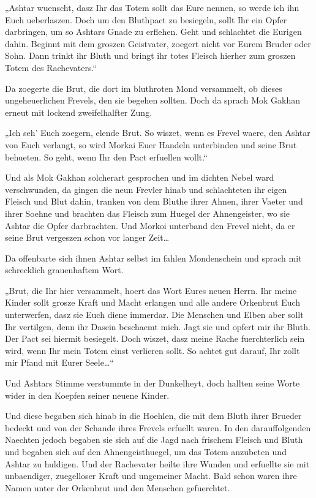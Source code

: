 \documentclass[a5paper,8pt]{book}
\begin{document}
„Ashtar wuenscht, dasz Ihr das Totem sollt das Eure nennen, so werde ich ihn Euch ueberlaszen. Doch um den Bluthpact zu besiegeln, sollt Ihr ein Opfer darbringen, um so Ashtars Gnade zu erflehen. Geht und schlachtet die Eurigen dahin. Beginnt mit dem groszen Geistvater, zoegert nicht vor Eurem Bruder oder Sohn. Dann trinkt ihr Bluth und bringt ihr totes Fleisch hierher zum groszen Totem des Rachevaters.“

Da zoegerte die Brut, die dort im bluthroten Mond versammelt, ob dieses ungeheuerlichen Frevels, den sie begehen sollten. Doch da sprach Mok Gakhan erneut mit lockend zweifelhalfter Zung.

„Ich seh’ Euch zoegern, elende Brut. So wiszet, wenn es Frevel waere, den Ashtar von Euch verlangt, so wird Morkai Euer Handeln unterbinden und seine Brut behueten. So geht, wenn Ihr den Pact erfuellen wollt.“

Und als Mok Gakhan solcherart gesprochen und im dichten Nebel ward verschwunden, da gingen die neun Frevler hinab und schlachteten ihr eigen Fleisch und Blut dahin, tranken von dem Bluthe ihrer Ahnen, ihrer Vaeter und ihrer Soehne und brachten das Fleisch zum Huegel der Ahnengeister, wo sie Ashtar die Opfer darbrachten. Und Morkoi unterband den Frevel nicht, da er seine Brut vergeszen schon vor langer Zeit…

Da offenbarte sich ihnen Ashtar selbst im fahlen Mondenschein und sprach mit schrecklich grauenhaftem Wort.

„Brut, die Ihr hier versammelt, hoert das Wort Eures neuen Herrn. Ihr meine Kinder sollt grosze Kraft und Macht erlangen und alle andere Orkenbrut Euch unterwerfen, dasz sie Euch diene immerdar. Die Menschen und Elben aber sollt Ihr vertilgen, denn ihr Dasein beschaemt mich. Jagt sie und opfert mir ihr Bluth.
Der Pact sei hiermit besiegelt. Doch wiszet, dasz meine Rache fuerchterlich sein wird, wenn Ihr mein Totem einst verlieren sollt. So achtet gut darauf, Ihr zollt mir Pfand mit Eurer Seele…“

Und Ashtars Stimme verstummte in der Dunkelheyt, doch hallten seine Worte wider in den Koepfen seiner neuene Kinder.

Und diese begaben sich hinab in die Hoehlen, die mit dem Bluth ihrer Brueder bedeckt und von der Schande ihres Frevels erfuellt waren. 
In den darauffolgenden Naechten jedoch begaben sie sich auf die Jagd nach frischem Fleisch und Bluth und begaben sich auf den Ahnengeisthuegel, um das Totem anzubeten und Ashtar zu huldigen. Und der Rachevater heilte ihre Wunden und erfuellte sie mit unbaendiger, zuegelloser Kraft und ungemeiner Macht. Bald schon waren ihre Namen unter der Orkenbrut und den Menschen gefuerchtet.
\end{document}
